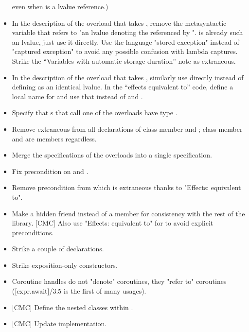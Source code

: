 \documentclass{wg21}
\begin{document}
\begin{itemize}
  even when  is a  lvalue reference.)
\item In the description of the 
  overload that takes ,
  remove the metasyntactic variable 
  that refers to "an lvalue denoting the 
  referenced by ".
   is already such an lvalue, just use it directly.
  Use the language "stored exception" instead of "captured exception"
  to avoid any possible confusion with lambda captures.
  Strike the ``Variables with automatic storage duration'' note
  as extraneous.
\item In the description of the 
  overload that takes ,
  similarly use  directly
  instead of defining  as an identical lvalue.
  In the ``effects equivalent to'' code,
  define a local name for 
  and use that instead of  and .
\item Specify that s that call
  one of the  overloads
  have type .
\item Remove extraneous  from all declarations
  of class-member  and ;
  class-member  and 
  are  members regardless.
\item Merge the specifications of the  overloads
  into a single specification.
\item Fix precondition on  and
  .
\item Remove precondition from 
  which is extraneous thanks to "Effects: equivalent to".
\item Make  a hidden friend instead of a member
  for consistency with the rest of the library.
  [CMC] Also use "Effects: equivalent to" for 
  to avoid explicit preconditions.
\item Strike a couple of  declarations.
\item Strike exposition-only constructors.
\item Coroutine handles do not "denote" coroutines,
  they "refer to" coroutines ([expr.await]/3.5 is the first of many usages).
\item{} [CMC] Define the nested classes within .
\item{} [CMC] Update implementation.
\end{itemize}
\end{document}
